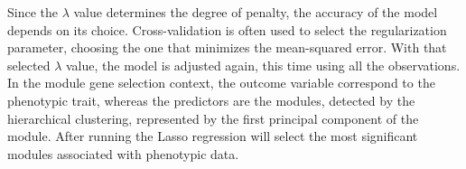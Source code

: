 \documentclass[journal, onecolumn]{IEEEtran}
\begin{document}


Since the $\lambda$ value determines the degree of penalty, the accuracy of the model depends on its choice. Cross-validation is often used to select the regularization parameter, choosing the one that minimizes the mean-squared error. With that selected $\lambda$ value, the model is adjusted again, this time using all the observations.\\

In the module gene selection context, the outcome variable correspond to the phenotypic trait, whereas the predictors are the modules, detected by the hierarchical clustering, represented by the first principal component of the module. After running the Lasso regression will select the most significant modules associated with phenotypic data.  
\end{document}

